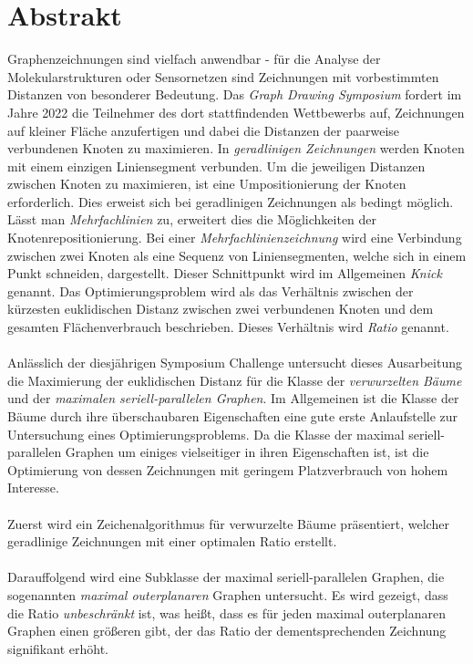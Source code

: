 \section*{Abstrakt}
Graphenzeichnungen sind vielfach anwendbar - für die Analyse der Molekularstrukturen oder Sensornetzen sind Zeichnungen mit vorbestimmten Distanzen von besonderer Bedeutung. Das \emph{Graph Drawing Symposium} fordert im Jahre 2022 die Teilnehmer des dort stattfindenden Wettbewerbs auf, Zeichnungen auf kleiner Fläche anzufertigen und dabei die Distanzen der paarweise verbundenen Knoten zu maximieren. In \emph{geradlinigen Zeichnungen} werden Knoten mit einem einzigen Liniensegment verbunden. Um die jeweiligen Distanzen zwischen Knoten zu maximieren, ist eine Umpositionierung der Knoten erforderlich. Dies erweist sich bei geradlinigen Zeichnungen als bedingt möglich. Lässt man \emph{Mehrfachlinien} zu, erweitert dies die Möglichkeiten der Knotenrepositionierung. Bei einer \emph{Mehrfachlinienzeichnung} wird eine Verbindung zwischen zwei Knoten als eine Sequenz von Liniensegmenten, welche sich in einem Punkt schneiden, dargestellt. Dieser Schnittpunkt wird im Allgemeinen \emph{Knick} genannt. Das Optimierungsproblem wird als das Verhältnis zwischen der kürzesten euklidischen Distanz zwischen zwei verbundenen Knoten und dem gesamten Flächenverbrauch beschrieben. Dieses Verhältnis wird \emph{Ratio} genannt.
\\\\
Anlässlich der diesjährigen Symposium Challenge untersucht dieses Ausarbeitung die Maximierung der euklidischen Distanz für die Klasse der \emph{verwurzelten Bäume} und der \emph{maximalen seriell-parallelen Graphen}. Im Allgemeinen ist die Klasse der Bäume durch ihre überschaubaren Eigenschaften eine gute erste Anlaufstelle zur Untersuchung eines Optimierungsproblems. Da die Klasse der maximal seriell-parallelen Graphen um einiges vielseitiger in ihren Eigenschaften ist, ist die Optimierung von dessen Zeichnungen mit geringem Platzverbrauch von hohem Interesse.
\\\\
Zuerst wird ein Zeichenalgorithmus für verwurzelte Bäume präsentiert, welcher geradlinige Zeichnungen mit einer optimalen Ratio erstellt.\\\\
Darauffolgend wird eine Subklasse der maximal seriell-parallelen Graphen, die sogenannten \emph{maximal outerplanaren} Graphen untersucht. Es wird gezeigt, dass die Ratio \emph{unbeschränkt} ist, was heißt, dass es für jeden maximal outerplanaren Graphen einen größeren gibt, der das Ratio der dementsprechenden Zeichnung signifikant erhöht.\\
